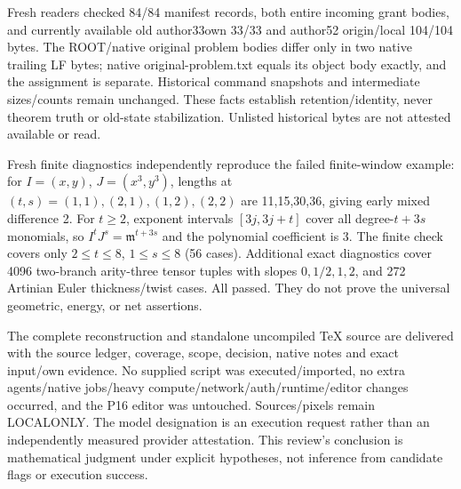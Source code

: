 \documentclass[
]{article}
\begin{document}
Fresh readers checked 84/84 manifest records, both entire incoming grant
bodies, and currently available old author33own 33/33 and author52
origin/local 104/104 bytes. The ROOT/native original problem bodies
differ only in two native trailing LF bytes; native original-problem.txt
equals its object body exactly, and the assignment is separate.
Historical command snapshots and intermediate sizes/counts remain
unchanged. These facts establish retention/identity, never theorem truth
or old-state stabilization. Unlisted historical bytes are not attested
available or read.

Fresh finite diagnostics independently reproduce the failed
finite-window example: for \(I=(x,y)\), \(J=(x^3,y^3)\), lengths at
\((t,s)=(1,1),(2,1),(1,2),(2,2)\) are 11,15,30,36, giving early mixed
difference 2. For \(t\ge2\), exponent intervals \([3j,3j+t]\) cover all
degree-\(t+3s\) monomials, so \(I^tJ^s=\mathfrak m^{t+3s}\) and the
polynomial coefficient is 3. The finite check covers only
\(2\le t\le8\), \(1\le s\le8\) (56 cases). Additional exact diagnostics
cover 4096 two-branch arity-three tensor tuples with slopes
\(0,1/2,1,2\), and 272 Artinian Euler thickness/twist cases. All passed.
They do not prove the universal geometric, energy, or net assertions.

The complete reconstruction and standalone uncompiled TeX source are
delivered with the source ledger, coverage, scope, decision, native
notes and exact input/own evidence. No supplied script was
executed/imported, no extra agents/native jobs/heavy
compute/network/auth/runtime/editor changes occurred, and the P16 editor
was untouched. Sources/pixels remain LOCALONLY. The model designation is
an execution request rather than an independently measured provider
attestation. This review's conclusion is mathematical judgment under
explicit hypotheses, not inference from candidate flags or execution
success.
\end{document}
